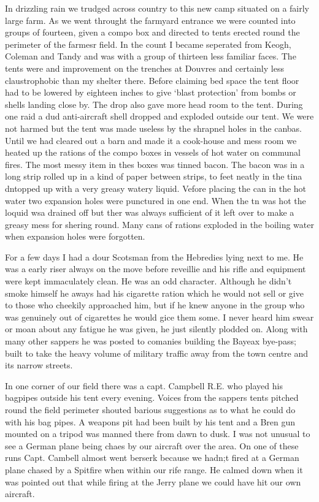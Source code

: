 In drizzling rain we trudged across country to this new camp situated
on a fairly large farm. As we went throught the farmyard entrance we
were counted into groups of fourteen, given a compo box and directed
to tents erected round the perimeter of the farmesr field. In the
count I became seperated from Keogh, Coleman and Tandy and was with a
group of thirteen less familiar faces. The tents were and improvement
on the trenches at Douvres and certainly less claustrophobic than my
shelter there. Before claiming bed space the tent floor had to be
lowered by eighteen inches to give `blast protection' from bombs or
shells landing close by. The drop also gave more head room to the
tent. During one raid a dud anti-aircraft shell dropped and exploded
outside our tent. We were not harmed but the tent was made useless by
the shrapnel holes in the canbas. Until we had cleared out a barn and
made it a cook-house and mess room we heated up the rations of the
compo boxes in vessels of hot water on communal fires. The most messy
item in thes boxes was tinned bacon. The bacon was in a long strip
rolled up in a kind of paper between strips, to feet neatly in the
tina dntopped up with a very greasy watery liquid. Vefore placing the
can in the hot water two expansion holes were punctured in one
end. When the tn was hot the loquid wsa drained off but ther was
always sufficient of it left over to make a greasy mess for shering
round. Many cans of rations exploded in the boiling water when
expansion holes were forgotten.

For a few days I had a dour Scotsman from the Hebredies lying next to
me. He was a early riser always on the move before reveillie and his
rifle and equipment were kept immaculately clean. He was an odd
character. Although he didn't smoke himself he aways had his cigarette
ration which he would not sell or give to those who cheekily
approached him, but if he knew anyone in the group who was genuinely
out of cigarettes he would gice them some. I never heard him swear or
moan about any fatigue he was given, he just silently plodded
on. Along with many other sappers he was posted to comanies building
the Bayeax bye-pass; built to take the heavy volume of military
traffic away from the town centre and its narrow streets.

In one corner of our field there was a capt. Campbell R.E. who played
his bagpipes outside his tent every evening. Voices from the sappers
tents pitched round the field perimeter shouted barious suggestions as
to what he could do with his bag pipes. A weapons pit had been built
by his tent and a Bren gun mounted on a tripod was manned there from
dawn to dusk. I was not unusual to see a German plane being chaes by
our aircraft over the area. On one of these runs Capt. Cambell almost
went berserk because we hadn;t fired at a German plane chased by a
Spitfire when within our rife range. He calmed down when it was
pointed out that while firing at the Jerry plane we could have hit our
own aircraft.

